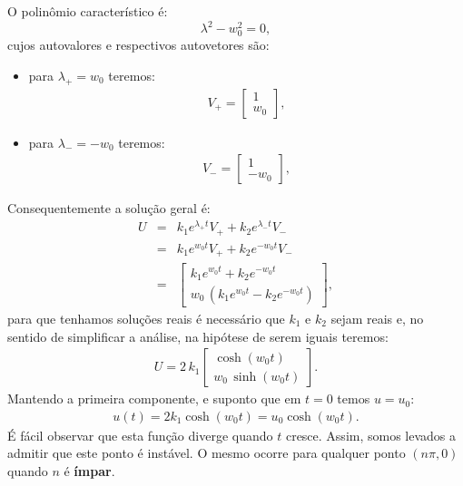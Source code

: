 \documentclass[12pt,openright,twoside,english,brazil]{abntex2}
\begin{document}
\begin{enumerate}[label=\alph*)]
O polinômio característico é: 
\begin{equation}
 \lambda^2 - w_0^2=0, \nonumber
\end{equation}
cujos autovalores e respectivos autovetores são:
\begin{itemize}
 \item para $\lambda_{+} = w_0$ teremos:
      \begin{eqnarray}
       V_{+} = \begin{bmatrix}
                1 \\
                w_0
               \end{bmatrix},
      \end{eqnarray}
 \item para $\lambda_{-} = - w_0$ teremos:
      \begin{eqnarray}
       V_{-} = \begin{bmatrix}
                1 \\
                - w_0
               \end{bmatrix},
      \end{eqnarray}
\end{itemize}
Consequentemente a solução geral é:
\begin{eqnarray}
 U & = & k_1 e^{\lambda_{+}t} V_{+} + k_2 e^{\lambda_{-}t} V_{-} \nonumber \\
   & = & k_1 e^{w_0t} V_{+} + k_2 e^{-w_0t} V_{-} \nonumber \\
   & = & \begin{bmatrix}
          k_1 e^{w_0t} + k_2 e^{-w_0t} \\
          w_0 \, \left( k_1 e^{w_0t} - k_2 e^{-w_0t} \right)
         \end{bmatrix},
\end{eqnarray}
para que tenhamos soluções reais é necessário que $k_1$ e $k_2$ sejam reais e, no sentido de simplificar a análise, na hipótese de serem iguais teremos:
\begin{eqnarray}
 U = 2\, k_1 \begin{bmatrix}
              \cosh{(w_0t)} \\
              w_0 \, \sinh{(w_0t)}
             \end{bmatrix}.
\end{eqnarray}
Mantendo a primeira componente, e suponto que em $t=0$ temos $u=u_0$:
\begin{eqnarray}
 \boxed{u(t) = 2k_1 \cosh{(w_0t)} = u_0 \cosh{(w_0t)}}.
 \label{equa24}
\end{eqnarray}
É fácil observar que esta função diverge quando $t$ cresce. Assim, somos levados a admitir que este ponto é instável. O mesmo ocorre para qualquer ponto $(n\pi,0)$ quando $n$ é \textbf{ímpar}.
\end{enumerate}
\end{document}
